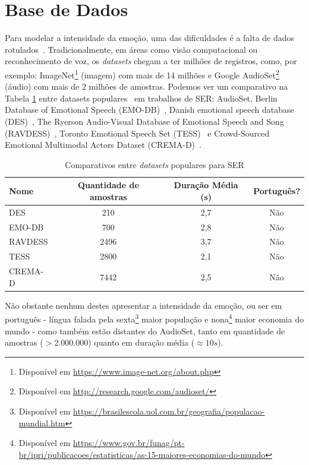\section{Base de Dados}\label{section:basesdedados}

Para modelar a intensidade da emoção, uma das dificuldades é a falta de dados rotulados~\cite{18}. Tradicionalmente, em áreas como visão computacional ou reconhecimento de voz, os \textit{datasets} chegam a ter milhões de registros, como, por exemplo: ImageNet\footnote{Disponível em \url{https://www.image-net.org/about.php}} (imagem) com  mais de 14 milhões e Google AudioSet\footnote{Disponível em \url{http://research.google.com/audioset/}} (áudio) com mais de 2 milhões de amostras. Podemos ver um comparativo na Tabela \ref{table:comparativodbs} entre datasets populares~\cite{32} em trabalhos de \acrshort{SER}: AudioSet, Berlin Database of Emotional Speech (EMO-DB)~\cite{32.55}, Danish emotional speech database (DES)~\cite{32.56}, The Ryerson Audio-Visual Database of Emotional Speech and Song (RAVDESS)~\cite{32.57}, Toronto Emotional Speech Set (TESS)~\cite{32.58} e Crowd-Sourced Emotional Multimodal Actors Dataset (CREMA-D)~\cite{32.59}.

\begin{table}[]
\centering
\caption{Comparativos entre \textit{datasets} populares para \acrshort{SER}}
    \begin{tabular}{|l|c|c|c|}
    \hline
        Nome & Quantidade de amostras & Duração Média (s) & Português?  \\ \hline
        DES  & 210 & 2,7 & Não  \\ \hline
        EMO-DB  & 700 & 2,8 & Não  \\ \hline
        RAVDESS  & 2496 & 3,7 & Não  \\ \hline
        TESS  & 2800 & 2,1 & Não  \\ \hline
        CREMA-D  & 7442 & 2,5 & Não  \\ \hline
    \end{tabular}\label{table:comparativodbs}
\end{table}

Não obstante nenhum destes apresentar a intensidade da emoção, ou ser em português - língua falada pela sexta\footnote{Disponível em \url{https://brasilescola.uol.com.br/geografia/populacao-mundial.htm}} maior população e nona\footnote{Disponível em \url{https://www.gov.br/funag/pt-br/ipri/publicacoes/estatisticas/as-15-maiores-economias-do-mundo}} maior economia do mundo - como também estão distantes do AudioSet, tanto em quantidade de amostras ($> 2.000.000$) quanto em duração média ($\approx 10s$).

